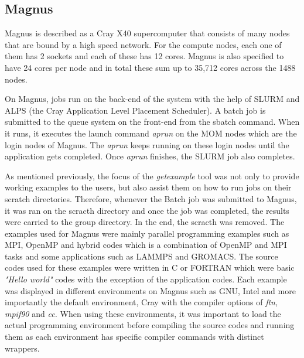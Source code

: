 \subsection{Magnus}

Magnus is described as a Cray X40 supercomputer that consists of many nodes that are bound by a high speed network. For the compute nodes, each one 
of them has 2 sockets and each of these has 12 cores. Magnus is also specified to have 24 cores per node and in total these sum up to 35,712 cores across 
the 1488 nodes. 

On Magnus, jobs run on the back-end of the system with the help of SLURM and ALPS (the Cray Application Level Placement Scheduler). A batch job is 
submitted to the queue system on the front-end from the sbatch command. When it runs, it executes the launch command \emph{aprun} on the MOM nodes 
which are the login nodes of Magnus. The \emph{aprun} keeps running on these login nodes until the application gets completed. Once \emph{aprun} finishes, the 
SLURM job also completes.

As mentioned previously, the focus of the \emph{getexample} tool was not only to provide working examples to the users, but also assist them on how to run jobs
on their scratch directories. Therefore, whenever the Batch job was submitted to Magnus, it was ran on the scracth directory and once the job was 
completed, the results were carried to the group directory. In the end, the scracth was removed. The examples used for Magnus were mainly parallel
programming examples such as MPI, OpenMP and hybrid codes which is a combination of OpenMP and MPI tasks and some applications such as LAMMPS and GROMACS.
The source codes used for these examples were written in C or FORTRAN which were basic \emph{"Hello world"} codes with the exception of the application codes.
Each example was displayed in different environments on Magnus such as GNU, Intel and more importantly the default environment, Cray with the compiler
options of \emph{ftn, mpif90} and \emph{cc.} When using these environments, it was important to load the actual programming environment before compiling the source
codes and running them as each environment has specific compiler commands with distinct wrappers.
